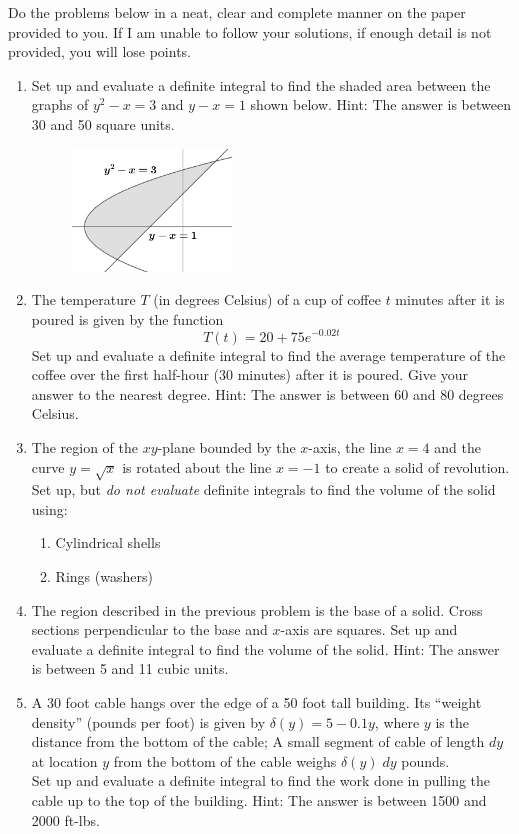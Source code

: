 \documentclass[12pt,letterpaper,fleqn]{article}
\theoremstyle{definition}
\begin{document}
Do the problems below in a neat, clear and complete manner on the paper provided to you. If I am unable to follow your solutions, if enough detail is not provided, you will lose points.
\begin{enumerate}
 \item Set up and evaluate a definite integral to find the shaded area between the graphs of $y^2 - x = 3$ and $y - x = 1$ shown below. Hint: The answer is between 30 and 50 square units.
       \begin{figure}[!htb]
        \centering
        \includegraphics[width=0.4\textwidth]{img/area_between_graphs.png}
       \end{figure}
 \item The temperature $T$ (in degrees Celsius) of a cup of coffee $t$ minutes after it is poured is given by the function
       \begin{equation*}
        T(t) = 20 + 75e^{-0.02t}
       \end{equation*}
       Set up and evaluate a definite integral to find the average temperature of the coffee over the first half-hour (30 minutes) after it is poured. Give your answer to the nearest degree. Hint: The answer is between 60 and 80 degrees Celsius.
 \item The region of the $xy$-plane bounded by the $x$-axis, the line $x = 4$ and the curve $y = \sqrt{x}$ is rotated about the line $x = -1$ to create a solid of revolution. Set up, but \emph{do not evaluate} definite integrals to find the volume of the solid using:
       \begin{enumerate}
        \item Cylindrical shells
        \item Rings (washers)
       \end{enumerate}
 \item The region described in the previous problem is the base of a solid. Cross sections perpendicular to the base and $x$-axis are squares. Set up and evaluate a definite integral to find the volume of the solid. Hint: The answer is between 5 and 11 cubic units.
 \item A 30 foot cable hangs over the edge of a 50 foot tall building. Its ``weight density'' (pounds per foot) is given by $\delta(y) = 5 - 0.1y$, where $y$ is the distance from the bottom of the cable; A small segment of cable of length $dy$ at location $y$ from the bottom of the cable weighs $\delta(y)\;dy$ pounds.\\[1.5ex] Set up and evaluate a definite integral to find the work done in pulling the cable up to the top of the building. Hint: The answer is between 1500 and 2000 ft-lbs.
\end{enumerate}
\end{document}

